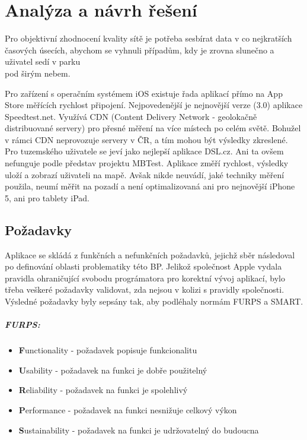 \chapter{Analýza a návrh řešení}
Pro objektivní zhodnocení kvality sítě je potřeba sesbírat data v co nejkratších časových úsecích, abychom se vyhnuli případům, kdy je zrovna slunečno a uživatel sedí v parku \\pod širým nebem. 

Pro zařízení s operačním systémem iOS existuje řada aplikací přímo na App Store měřících rychlost připojení. Nejpovedenější je nejnovější verze (3.0) aplikace Speedtest.net. Využívá CDN (Content Delivery Network - geolokačně distribuované servery) pro přesné měření na více místech po celém světě. Bohužel v rámci CDN neprovozuje servery v ČR, a tím mohou být výsledky zkreslené. Pro tuzemského uživatele se jeví jako nejlepší aplikace DSL.cz. Ani ta ovšem nefunguje podle představ projektu MBTest. Aplikace změří rychlost, výsledky uloží a zobrazí uživateli na mapě. Avšak nikde neuvádí, jaké techniky měření použila, neumí měřit na pozadí a není optimalizovaná ani pro nejnovější iPhone 5, ani pro tablety iPad.

\section{Požadavky}
Aplikace se skládá z funkčních a nefunkčních požadavků, jejichž sběr následoval po definování oblasti problematiky této BP. Jelikož společnost Apple vydala pravidla ohraničující svobodu prográmatora pro korektní vývoj aplikací, bylo třeba veškeré požadavky validovat, zda nejsou v kolizi s pravidly společnosti. Výsledné požadavky byly sepsány tak, aby podléhaly normám FURPS a SMART.

\paragraph{FURPS: }
\begin{itemize}
	\item {\bf F}unctionality - požadavek popisuje funkcionalitu		
	\item {\bf U}sability - požadavek na funkci je dobře použitelný
	\item {\bf R}eliability - požadavek na funkci je spolehlivý
	\item {\bf P}erformance - požadavek na funkci nesnižuje celkový výkon
	\item {\bf S}ustainability - požadavek na funkci je udržovatelný do budoucna
\end{itemize}
